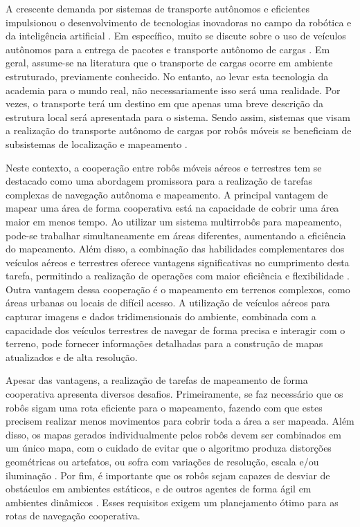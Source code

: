 %
%
\vspace{-42pt}

A crescente demanda por sistemas de transporte autônomos e eficientes impulsionou o desenvolvimento de tecnologias inovadoras no campo da robótica e da inteligência artificial \cite{Chen2023MilestonesSurveys} \cite{Teng2023MotionPerspectives}. Em específico, muito se discute sobre o uso de veículos autônomos para a entrega de pacotes e transporte autônomo de cargas \cite{Bacheti2022Leader-FollowerDelivery} \cite{Vale2021VeiculoIndustrial} \cite{Bacheti2021ALast-Mile-Delivery}.
Em geral, assume-se na literatura que o transporte de cargas ocorre em ambiente estruturado, previamente conhecido. No entanto, ao levar esta tecnologia da academia para o mundo real, não necessariamente isso será uma realidade. Por vezes, o transporte terá um destino em que apenas uma breve descrição da estrutura local será apresentada para o sistema. Sendo assim, sistemas que visam a realização do transporte autônomo de cargas por robôs móveis se beneficiam de subsistemas de localização e mapeamento \cite{Cadena2016PastAge}.

Neste contexto, a cooperação entre robôs móveis aéreos e terrestres tem se destacado como uma abordagem promissora para a realização de tarefas complexas de navegação autônoma e mapeamento. A principal vantagem de mapear uma área de forma cooperativa está na capacidade de cobrir uma área maior em menos tempo. Ao utilizar um sistema multirrobôs para mapeamento, pode-se trabalhar simultaneamente em áreas diferentes, aumentando a eficiência do mapeamento\cite{Feng2020AnSystems}. Além disso, a combinação das habilidades complementares dos veículos aéreos e terrestres oferece vantagens significativas no cumprimento desta tarefa, permitindo a realização de operações com maior eficiência e flexibilidade \cite{Bacheti2022Leader-FollowerDelivery}. Outra vantagem dessa cooperação é o mapeamento em terrenos complexos, como áreas urbanas ou locais de difícil acesso. A utilização de veículos aéreos para capturar imagens e dados tridimensionais do ambiente, combinada com a capacidade dos veículos terrestres de navegar de forma precisa e interagir com o terreno, pode fornecer informações detalhadas para a construção de mapas atualizados e de alta resolução.

Apesar das vantagens, a realização de tarefas de mapeamento de forma cooperativa apresenta diversos desafios. Primeiramente, se faz necessário que os robôs sigam uma rota eficiente para o mapeamento, fazendo com que estes precisem realizar menos movimentos para cobrir toda a área a ser mapeada.  Além disso, os mapas gerados individualmente pelos robôs devem ser combinados em um único mapa, com o cuidado de evitar que o algoritmo produza distorções geométricas ou artefatos, ou sofra com variações de resolução, escala e/ou iluminação \cite{Bavle2023FromSurvey} \cite{AbaspurKazerouni2022ASLAM}. Por fim, é importante que os robôs sejam capazes de desviar de obstáculos em ambientes estáticos, e de outros agentes de forma ágil em ambientes dinâmicos \cite{Li2022VisualDetection}. Esses requisitos exigem um planejamento ótimo para as rotas de navegação cooperativa\cite{Vasconcelos2020Real-timeMissions}.


